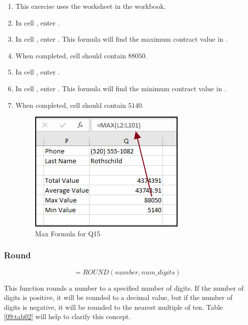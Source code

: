 \begin{enumbox}
	\begin{enumerate}
		\item This exercise uses the  worksheet in the  workbook.
		\item In cell , enter .
		\item In cell , enter . This formula will find the maximum contract value in .
		\item When completed, cell  should contain $ 88050 $.
		\item In cell , enter .
		\item In cell , enter . This formula will find the minimum contract value in .
		\item When completed, cell  should contain $ 5140 $.
	
		\begin{figure}[H]
			\centering
			\includegraphics[width=\maxwidth{.75\linewidth}]{gfx/ch09_fig40}
			\caption{Max Formula for Q15}
			\label{09:fig40}
		\end{figure}
	
	\end{enumerate}
\end{enumbox}
	
\subsubsection{Round}

\[ =ROUND(number, num\_digits) \]

This function rounds a number to a specified number of digits. If the number of digits is positive, it will be rounded to a decimal value, but if the number of digits is negative, it will be rounded to the nearest multiple of ten. Table \ref{09:tab02} will help to clarify this concept.

